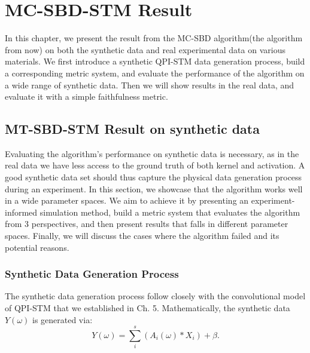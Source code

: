 \chapter{MC-SBD-STM Result}

In this chapter, we present the result from the \ac{MC-SBD} algorithm(the algorithm from now) on both the synthetic data and real experimental data on various materials. We first introduce a synthetic QPI-STM data generation process, build a corresponding metric system, and evaluate the performance of the algorithm on a wide range of synthetic data. Then we will show results in the real data, and evaluate it with a simple faithfulness metric. 

\section{MT-SBD-STM Result on synthetic data}
Evaluating the algorithm's performance on synthetic data is necessary, as in the real data we have less access to the ground truth of both kernel and activation. A good synthetic data set should thus capture the physical data generation process during an experiment. In this section, we showcase that the algorithm works well in a wide parameter spaces. We aim to achieve it by presenting an experiment-informed simulation method, build a metric system that evaluates the algorithm from 3 perspectives, and then present results that falls in different parameter spaces. Finally, we will discuss the cases where the algorithm failed and its potential reasons. 

\subsection{Synthetic Data Generation Process}
The synthetic data generation process follow closely with the convolutional model of QPI-STM that we established in Ch. 5. Mathematically, the synthetic data $Y(\omega)$ is generated via:
\begin{equation}
	Y(\omega) = \sum_i^s ( A_i(\omega) * X_i) + \beta. 
\end{equation} 


